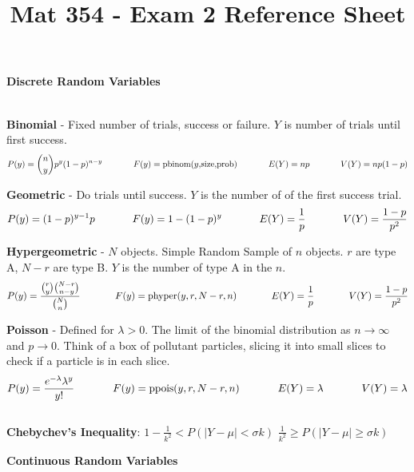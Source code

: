 \documentclass{scrartcl}
\title{Mat 354 - Exam 2 Reference Sheet}
\begin{document}
\begin{Large}\textbf{Discrete Random Variables}\end{Large}\\

\textbf{Binomial} - Fixed number of trials, success or failure. $Y$ is number of trials until first success.
$$P(y) = {n \choose y}p^y(1-p)^{n-y} \text{\hspace{0.5in}} F(y) = \text{pbinom($y$,size,prob)} \text{\hspace{0.5in}} E(Y) = np \text{\hspace{0.5in}} V(Y) = np(1-p)$$

\textbf{Geometric} - Do trials until success. $Y$ is the number of of the first success trial.
$$P(y) = (1-p)^{y-1}p \text{\hspace{0.5in}} F(y) = 1 - (1-p)^y \text{\hspace{0.5in}} E(Y) = \frac{1}{p} \text{\hspace{0.5in}} V(Y) = \frac{1-p}{p^2}$$

\textbf{Hypergeometric} - $N$ objects. Simple Random Sample of $n$ objects. $r$ are type A, $N-r$ are type B. $Y$ is the number of type A in the $n$.
$$P(y) = \frac{{r \choose y}{N-r \choose n-y}}{{N \choose n}} \text{\hspace{0.5in}} F(y) = \text{phyper($y,r,N-r,n$)} \text{\hspace{0.5in}} E(Y) = \frac{1}{p} \text{\hspace{0.5in}} V(Y) = \frac{1-p}{p^2}$$

\textbf{Poisson} - Defined for $\lambda > 0$. The limit of the binomial distribution as $n\rightarrow\infty$ and $p \rightarrow0$. Think of a box of pollutant particles, slicing it into small slices to check if a particle is in each slice.
$$P(y) = \frac{e^{-\lambda}\lambda^y}{y!} \text{\hspace{0.5in}} F(y) = \text{ppois($y,r,N-r,n$)} \text{\hspace{0.5in}} E(Y) = \lambda \text{\hspace{0.5in}} V(Y) = \lambda$$\\

\textbf{Chebychev's Inequality}:  \hspace{0.5in} $1 - \frac{1}{k^2} < P(|Y-\mu|<\sigma k)$ \hspace{0.5in}$\frac{1}{k^2} \ge P(|Y-\mu|\ge\sigma k)$\\
\begin{Large}\textbf{Continuous Random Variables}\end{Large}\\
\end{document}

